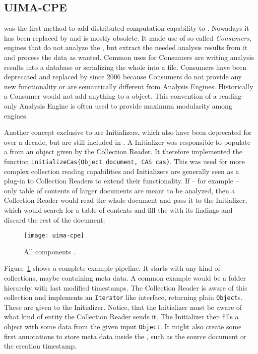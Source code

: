 \subsection{UIMA-CPE}
\label{ssec:uimacpe}
\uimacpe{} was the first method to add distributed computation capability to \uima{}. Nowadays it has been replaced by \uimaas{} and is mostly obsolete. It made use of so called \emph{\cas{} Consumers}, engines that do not analyze the \cas{}, but extract the needed analysis results from it and process the data as wanted. Common uses for \cas{} Consumers are writing analysis results into a database or serializing the whole \cas{} into a \xmi{} file. \cas{} Consumers have been deprecated and replaced by \anens{} since 2006 \uimacpe{} because \cas{} Consumers do not provide any new functionality or are semantically different from Analysis Engines. Historically a \cas{} Consumer would not add anything to a \cas{} object. This convention of a reading-only Analysis Engine is often used to provide maximum modularity among \uima{} engines.


Another concept exclusive to \uimacpe{} are \cas{} Initializers, which also have been deprecated for over a decade, but are still included in \uima{}. A \cas{} Initializer was responsible to populate a \cas{} from an object given by the Collection Reader. It therefore implemented the function \lstinline|initializeCas(Object document, CAS cas)|. This was used for more complex collection reading capabilities and \cas{} Initializers are generally seen as a plug-in to Collection Readers to extend their functionality. If -- for example -- only table of contents of larger documents are meant to be analyzed, then a Collection Reader would read the whole document and pass it to the \cas{} Initializer, which would search for a table of contents and fill the \cas{} with its findings and discard the rest of the document.


\begin{figure}[hbt]
	
	\centering
	\texttt{[image: uima-cpe]}
	\caption[All \uimacpe{} components.]{All \uimacpe{} components \cite{uimacpe}.}
	\label{fig:uimacpe}
\end{figure}


Figure~\ref{fig:uimacpe} shows a complete example pipeline. It starts with any kind of collections, maybe containing meta data. A common example would be a folder hierarchy with last modified timestamps. The Collection Reader is aware of this collection and implements an \lstinline|Iterator| like interface, returning plain \lstinline|Object|s. These are given to the \cas{} Initializer. Notice, that the \cas{} Initializer must be aware of what kind of entity the Collection Reader sends it. The \cas{} Initializer then fills a \cas{} object with some data from the given input \lstinline|Object|. It might also create some first annotations to store meta data inside the \cas{}, such as the source document \URL{} or the creation timestamp. 

